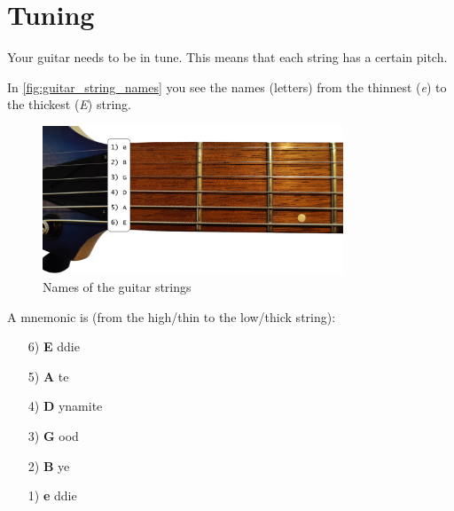 \section{Tuning}

Your guitar needs to be in tune. This means that each string has a certain pitch.

In \autoref{fig:guitar_string_names} you see the names (letters) from the thinnest (\textit{e}) to the thickest (\textit{E}) string.

\begin{figure}[h]
    \centering
    \includegraphics[width=0.8\textwidth]{../../Images/guitar-neck-string-names.png}
    \caption{Names of the guitar strings}
    \label{fig:guitar_string_names}
\end{figure}

A mnemonic is (from the high/thin to the low/thick string):

\begin{minipage}{0.25\textwidth}
    \vspace{3mm}
    \begin{itemize}
        \setlength\itemsep{0em}
        \item[6)] \textbf{E} ddie
        \item[5)] \textbf{A} te
        \item[4)] \textbf{D} ynamite
        \item[3)] \textbf{G} ood
        \item[2)] \textbf{B} ye
        \item[1)] \textbf{e} ddie 
    \end{itemize}
    \vspace{3mm}
\end{minipage}
\hfill
\begin{minipage}{0.7\textwidth}
\end{minipage}

